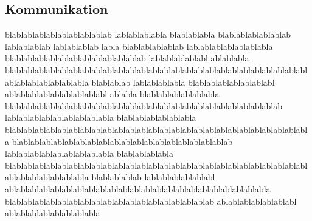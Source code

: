 \subsection{Kommunikation}

blablablablablablablablablab lablablablabla blablablabla blablablablablablab  lablablablab lablablablab labla
blablablablablab lablablablablablablabla blablablablablablablablablablablablab lablablablablabl ablablabla
blablablablablablablablablablablablablablablablablablablablablablablablablablablablablablablablablabla
blablablab lablablablabla blablablablablablablabl  ablablablablablablablablabl ablabla blablablablablablabla
blablablablablablablablablablablablablablablablablablablablablablablablab lablablablablablablablablabla
blablablablablablabla blablablablablablablablablablablablablablablablablablablablablablablablablablabla
blablablablablablablablablablablablablablablablablablablab lablablablablablablablablabla  blablablablabla
blablablablablablablablablablablablablablablablablablablablablablablablablablablablablablablablablabla
blablablablab lablablablablablabl ablablablablablablablablablablablablablablablablablablablablablablabla
blablablablablablablablablablablablablablablablablablab ablablablablablablabl ablablablablablablablabla